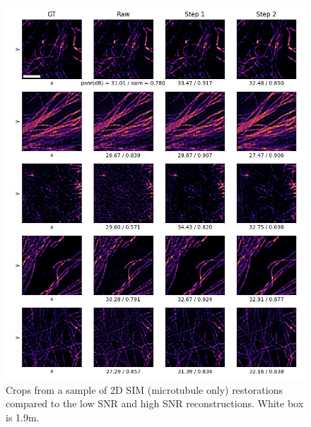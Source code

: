 \documentclass[12pt]{article}
\begin{document}
\begin{figure}[hbtp]
    \includegraphics[scale=0.75, center]{figures/m019_m020_reconstruction_samples.png}
    \caption{Crops from a sample of 2D SIM (microtubule only) restorations compared to the low SNR and high SNR reconstructions.
    White box is 1.9\textmu m.}
    \label{fig:2D_mo_further_samples}
\end{figure}
\end{document}
